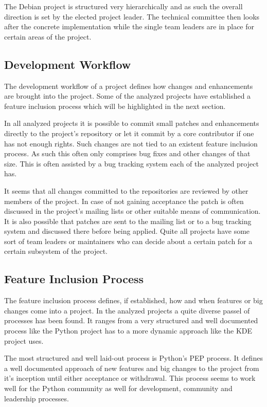 The Debian project is structured very hierarchically and as such the overall
direction is set by the elected project leader. The technical committee then
looks after the concrete implementation while the single team leaders are in
place for certain areas of the project.


\subsection{Development Workflow} %

The development workflow of a project defines how changes and enhancements are
brought into the project. Some of the analyzed projects have established a
feature inclusion process which will be highlighted in the next section.

In all analyzed projects it is possible to commit small patches and
enhancements directly to the project's repository or let it commit by a core
contributor if one has not enough rights. Such changes are not tied to an
existent feature inclusion process. As such this often only comprises bug fixes
and other changes of that size. This is often assisted by a bug tracking system
each of the analyzed project has.

It seems that all changes committed to the repositories are reviewed by other
members of the project. In case of not gaining acceptance the patch is often
discussed in the project's mailing lists or other suitable means of
communication. It is also possible that patches are sent to the mailing list or
to a bug tracking system and discussed there before being applied. Quite all
projects have some sort of team leaders or maintainers who can decide about a
certain patch for a certain subsystem of the project.


\subsection{Feature Inclusion Process} %

The feature inclusion process defines, if established, how and when features or
big changes come into a project. In the analyzed projects a quite diverse
passel of processes has been found. It ranges from a very structured and well
documented process like the Python project has to a more dynamic approach like
the KDE project uses.

The most structured and well laid-out process is Python's \ac{PEP} process. It
defines a well documented approach of new features and big changes to the
project from it's inception until either acceptance or withdrawal. This process
seems to work well for the Python community as well for development, community
and leadership processes.

